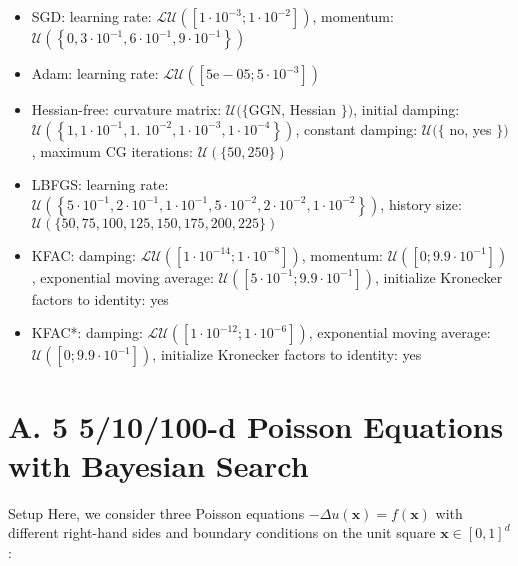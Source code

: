 \documentclass[10pt]{article}
\begin{document}
\begin{itemize}
  \item SGD: learning rate: $\mathcal{L U}\left(\left[1 \cdot 10^{-3} ; 1 \cdot 10^{-2}\right]\right)$, momentum: $\mathcal{U}\left(\left\{0,3 \cdot 10^{-1}, 6 \cdot 10^{-1}, 9 \cdot 10^{-1}\right\}\right)$
  \item Adam: learning rate: $\mathcal{L U}\left(\left[5 \mathrm{e}-05 ; 5 \cdot 10^{-3}\right]\right)$
  \item Hessian-free: curvature matrix: $\mathcal{U}(\{\mathrm{GGN}$, Hessian $\})$, initial damping: $\mathcal{U}\left(\left\{1,1 \cdot 10^{-1}, 1\right.\right.$. $\left.\left.10^{-2}, 1 \cdot 10^{-3}, 1 \cdot 10^{-4}\right\}\right)$, constant damping: $\mathcal{U}(\{$ no, yes $\})$, maximum CG iterations: $\mathcal{U}(\{50,250\})$
  \item LBFGS: learning rate: $\mathcal{U}\left(\left\{5 \cdot 10^{-1}, 2 \cdot 10^{-1}, 1 \cdot 10^{-1}, 5 \cdot 10^{-2}, 2 \cdot 10^{-2}, 1 \cdot 10^{-2}\right\}\right)$, history size: $\mathcal{U}(\{50,75,100,125,150,175,200,225\})$
  \item KFAC: damping: $\mathcal{L U}\left(\left[1 \cdot 10^{-14} ; 1 \cdot 10^{-8}\right]\right)$, momentum: $\mathcal{U}\left(\left[0 ; 9.9 \cdot 10^{-1}\right]\right)$, exponential moving average: $\mathcal{U}\left(\left[5 \cdot 10^{-1} ; 9.9 \cdot 10^{-1}\right]\right)$, initialize Kronecker factors to identity: yes
  \item KFAC*: damping: $\mathcal{L U}\left(\left[1 \cdot 10^{-12} ; 1 \cdot 10^{-6}\right]\right)$, exponential moving average: $\mathcal{U}\left(\left[0 ; 9.9 \cdot 10^{-1}\right]\right)$, initialize Kronecker factors to identity: yes
\end{itemize}

\section*{A. 5 5/10/100-d Poisson Equations with Bayesian Search}
Setup Here, we consider three Poisson equations $-\Delta u(\boldsymbol{x})=f(\boldsymbol{x})$ with different right-hand sides and boundary conditions on the unit square $\boldsymbol{x} \in[0,1]^{d}$ :
\end{document}
